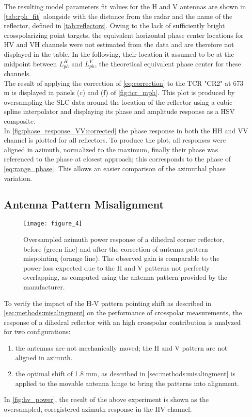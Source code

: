 The resulting model parameters fit values for the H and V antennas are shown in \autoref{tab:rph_fit} alongside with the distance from the radar and the name of the reflector, defined in \autoref{tab:reflectors}. Owing to the lack of sufficiently bright crosspolarizing point targets, the equivalent horizontal phase center locations for HV and VH channels were not estimated from the data and are therefore not displayed in the table. In the following, their location it assumed to be at the midpoint between $L_{ph}^{H}$ and $L_{ph}^{V}$, the theoretical equivalent phase center for these channels.\\
The result of applying the correction of \eqref{eq:correction} to the TCR "CR2" at 673 m is displayed in panels (c) and (f) of \autoref{fig:tcr_mph}. This plot is produced by oversampling the SLC data around the location of the reflector using a cubic spline interpolator and displaying its phase and amplitude response as a HSV composite.\\
In \autoref{fig:phase_response_VV:corrected} the phase response in both the HH and VV channel is plotted for all reflectors. To produce the plot, all responses were aligned in azimuth, normalized to the maximum, finally their phase was referenced to the phase at closest approach; this corresponds to the phase of \eqref{eq:range_phase}. This allows an easier comparison of the azimuthal phase variation.
\subsection{Antenna Pattern Misalignment}\label{sec:results:misalignment}
\begin{figure}[Ht!]
	\centering
	\texttt{[image: figure\_4]}
	\caption{Oversampled azimuth power response of a dihedral corner reflector, before (green line) and after the correction of antenna pattern mispointing (orange line). The observed gain is comparable to the power loss expected due to the H and V patterns not perfectly overlapping, as computed using the antenna pattern provided by the manufacturer.}
	\label{fig:hv_power}
\end{figure}
To verify the impact of the H-V pattern pointing shift as described in \autoref{sec:methods:misalingment} on the performance of crosspolar measurements, the response of a dihedral reflector with an high crosspolar contribution is analyzed for two configurations:\\ 
\begin{enumerate}
	\item the antennas are not mechanically moved; the H and V pattern are not aligned in azimuth.
	\item the optimal shift of 1.8 mm, as described in \autoref{sec:methods:misalingment} is applied to the movable antenna hinge to bring the patterns into alignment.\\ 
\end{enumerate}
In \autoref{fig:hv_power}, the result of the above experiment is shown as the oversampled, coregistered azimuth response in the HV channel.
